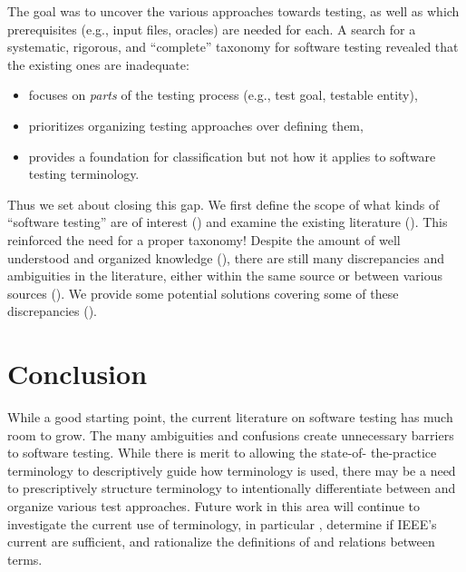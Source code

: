 \documentclass[conference]{IEEEtran}
\begin{document}
The goal was to uncover the various approaches towards testing, as well as
which prerequisites (e.g., input files, oracles) are needed for each.  A search
for a systematic, rigorous, and ``complete'' taxonomy for software testing
revealed that the existing ones are inadequate:

\begin{itemize}
    \item \cite{TebesEtAl2020a} focuses on \emph{parts} of the
          testing process (e.g., test goal, testable entity),
    \item \cite{SouzaEtAl2017} prioritizes organizing testing
          approaches over defining them,
    \item \cite{UnterkalmsteinerEtAl2014} provides a foundation for
          classification but not how it applies to software testing terminology.
\end{itemize}

Thus we set about closing this gap. We first define the scope of what kinds of
``software testing'' are of interest () and examine the existing
literature (). This reinforced the need for a proper taxonomy!
Despite the amount of well understood and organized knowledge (),
there are still many discrepancies and ambiguities in the literature, either
within the same source or between various sources (). We provide
some potential solutions covering some of these discrepancies ().







\section{Conclusion}

While a good starting point, the current literature on software testing has
much room to grow. The many ambiguities and confusions create unnecessary
barriers to software testing. While there is merit to allowing the state-of-%
the-practice terminology to descriptively guide how terminology is used, there
may be a need to prescriptively structure terminology to intentionally
differentiate between and organize various test approaches. Future work in this
area will continue to investigate the current use of terminology, in
particular , determine if IEEE's current
 are sufficient, and rationalize the definitions of
and relations between terms.
\end{document}
